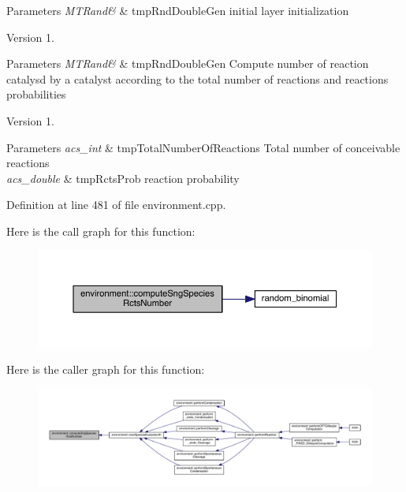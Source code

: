 \begin{DoxyParams}{Parameters}
{\em M\+T\+Rand\&} & tmp\+Rnd\+Double\+Gen initial layer initialization \\
\hline
\end{DoxyParams}
\begin{DoxyVersion}{Version}
1. 
\end{DoxyVersion}

\begin{DoxyParams}{Parameters}
{\em M\+T\+Rand\&} & tmp\+Rnd\+Double\+Gen Compute number of reaction catalysd by a catalyst according to the total number of reactions and reactions probabilities \\
\hline
\end{DoxyParams}
\begin{DoxyVersion}{Version}
1. 
\end{DoxyVersion}

\begin{DoxyParams}{Parameters}
{\em acs\+\_\+int} & tmp\+Total\+Number\+Of\+Reactions Total number of conceivable reactions \\
\hline
{\em acs\+\_\+double} & tmp\+Rcts\+Prob reaction probability \\
\hline
\end{DoxyParams}


Definition at line 481 of file environment.\+cpp.



Here is the call graph for this function\+:\nopagebreak
\begin{figure}[H]
\begin{center}
\leavevmode
\includegraphics[width=350pt]{a00013_a0fd3cb062d35d2f6dd8961e95dd477b7_cgraph}
\end{center}
\end{figure}




Here is the caller graph for this function\+:\nopagebreak
\begin{figure}[H]
\begin{center}
\leavevmode
\includegraphics[width=350pt]{a00013_a0fd3cb062d35d2f6dd8961e95dd477b7_icgraph}
\end{center}
\end{figure}


